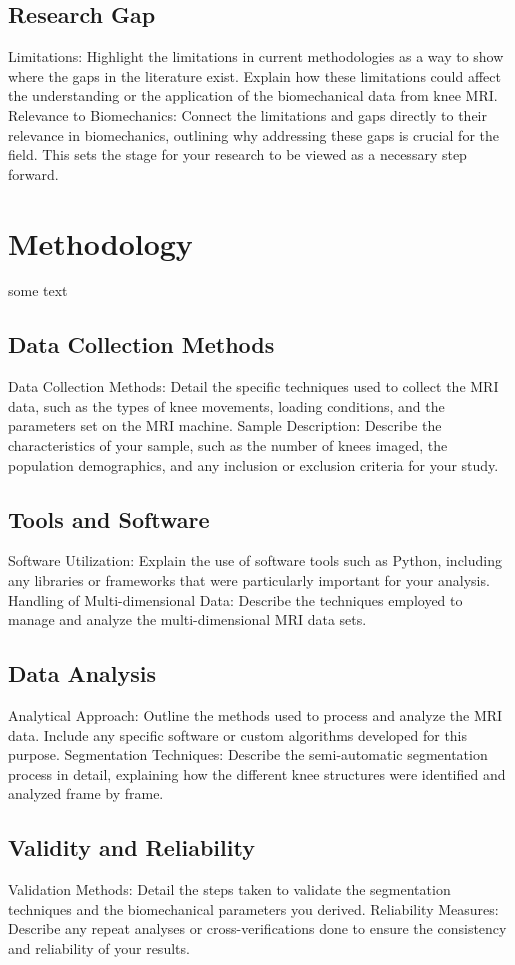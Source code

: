 \documentclass{micro-econ-thesis}
\begin{document}
\subsection{Research Gap}
Limitations: Highlight the limitations in current methodologies as a way to show where the gaps in the literature exist. Explain how these limitations could affect the understanding or the application of the biomechanical data from knee MRI.
Relevance to Biomechanics: Connect the limitations and gaps directly to their relevance in biomechanics, outlining why addressing these gaps is crucial for the field. This sets the stage for your research to be viewed as a necessary step forward.

\section{Methodology}
\label{sec:second}
some text 
\subsection{Data Collection Methods}
Data Collection Methods: Detail the specific techniques used to collect the MRI data, such as the types of knee movements, loading conditions, and the parameters set on the MRI machine.
Sample Description: Describe the characteristics of your sample, such as the number of knees imaged, the population demographics, and any inclusion or exclusion criteria for your study.
\subsection{Tools and Software}
Software Utilization: Explain the use of software tools such as Python, including any libraries or frameworks that were particularly important for your analysis.
Handling of Multi-dimensional Data: Describe the techniques employed to manage and analyze the multi-dimensional MRI data sets.
\subsection{Data Analysis}
Analytical Approach: Outline the methods used to process and analyze the MRI data. Include any specific software or custom algorithms developed for this purpose.
Segmentation Techniques: Describe the semi-automatic segmentation process in detail, explaining how the different knee structures were identified and analyzed frame by frame.


\subsection{Validity and Reliability}
Validation Methods: Detail the steps taken to validate the segmentation techniques and the biomechanical parameters you derived.
Reliability Measures: Describe any repeat analyses or cross-verifications done to ensure the consistency and reliability of your results.
\end{document}
